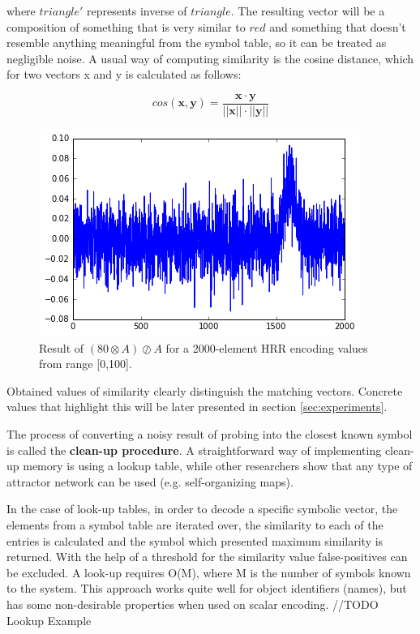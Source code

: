 \documentclass[conference]{IEEEtran}
\begin{document}
	where $triangle'$ represents inverse of $triangle$.
The resulting vector will be a composition of something that is very similar to $red$ and something that doesn't resemble anything meaningful from the symbol table, so it can be treated as negligible noise.	A usual way of computing similarity is the cosine distance, which for two vectors \pmb x and \pmb y is calculated as follows:
	
	\begin{equation}
cos(\pmb x, \pmb y) = \frac {\pmb x \cdot \pmb y}{||\pmb x|| \cdot ||\pmb y||}
	\end{equation} 
	
	
	\begin{figure}
		\center
		\includegraphics[width=0.9\columnwidth]{img/scalar-probe.png}
		\caption{Result of $(80 \otimes A) \oslash A$ for a 2000-element HRR encoding values from range [0,100].}
	\end{figure}
	
	Obtained values of similarity clearly distinguish the matching vectors. Concrete values that highlight this will be later presented in section \ref{sec:experiments}.	
	
	The process of converting a noisy result of probing into the closest known symbol is called the \textbf{clean-up procedure}.
A straightforward way of implementing clean-up memory is using a lookup table, while other researchers show that any type of attractor network can be used (e.g. self-organizing maps).

	In the case of look-up tables, in order to decode a specific symbolic vector, the elements from a symbol table are iterated over, the similarity to each of the entries is calculated and the symbol which presented maximum similarity is returned. With the help of a threshold for the similarity value false-positives can be excluded. A look-up requires O(M), where M is the number of symbols known to the system. This approach works quite well for object identifiers (names), but has some non-desirable properties when used on scalar encoding.
	//TODO Lookup Example
	
\end{document}
